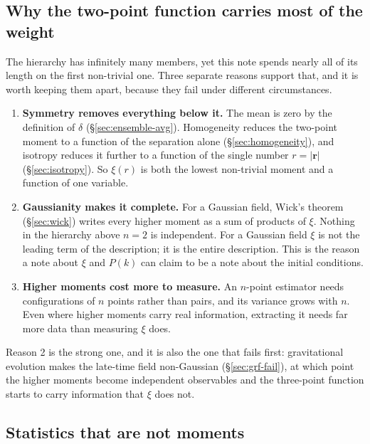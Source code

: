 \documentclass[12pt]{article}
\newcommand{\br}{\mathbf{r}}
\begin{document}
\subsection{Why the two-point function carries most of the weight}
\label{sec:whytwopoint}

The hierarchy has infinitely many members, yet this note spends nearly
all of its length on the first non-trivial one.  Three separate reasons
support that, and it is worth keeping them apart, because they fail under
different circumstances.

\begin{enumerate}
  \item \textbf{Symmetry removes everything below it.}  The mean is zero
        by the definition of $\delta$ (\S\ref{sec:ensemble-avg}).
        Homogeneity reduces the two-point moment to a function of the
        separation alone (\S\ref{sec:homogeneity}), and isotropy reduces
        it further to a function of the single number $r = |\br|$
        (\S\ref{sec:isotropy}).  So $\xi(r)$ is both the lowest
        non-trivial moment and a function of one variable.
  \item \textbf{Gaussianity makes it complete.}  For a Gaussian field,
        Wick's theorem (\S\ref{sec:wick}) writes every higher moment as a
        sum of products of $\xi$.  Nothing in the hierarchy above $n = 2$
        is independent.  For a Gaussian field $\xi$ is not the leading
        term of the description; it is the entire description.  This is
        the reason a note about $\xi$ and $P(k)$ can claim to be a note
        about the initial conditions.
  \item \textbf{Higher moments cost more to measure.}  An $n$-point
        estimator needs configurations of $n$ points rather than pairs,
        and its variance grows with $n$.  Even where higher moments carry
        real information, extracting it needs far more data than
        measuring $\xi$ does.
\end{enumerate}

Reason 2 is the strong one, and it is also the one that fails first:
gravitational evolution makes the late-time field non-Gaussian
(\S\ref{sec:grf-fail}), at which point the higher moments become
independent observables and the three-point function starts to carry
information that $\xi$ does not.

\subsection{Statistics that are not moments}
\label{sec:nonmoments}
\end{document}
